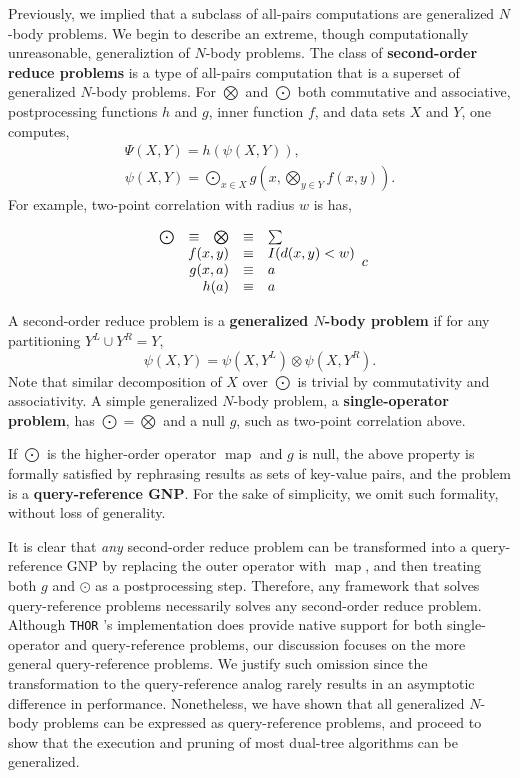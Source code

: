 \documentclass[twoside,leqno,twocolumn]{article}
\newcommand{\THOR}{{{\tt THOR}} }
\newcommand{\union}{\cup}
\DeclareMathOperator*{\map}{map}
\newcommand{\Gnp}{\Psi}
\newcommand{\gnp}{\psi}
\newcommand{\defterm}[1]{{\bf #1}}
\newcommand{\kdleft}[1]{#1^{\!L}}
\newcommand{\kdright}[1]{#1^{\!R}}
\begin{document}
Previously, we implied that a subclass of all-pairs computations are generalized $N$-body problems.
We begin to describe an extreme, though computationally unreasonable, generaliztion of $N$-body problems.
The class of \defterm{second-order reduce problems} is a type of all-pairs computation that is a superset of generalized $N$-body problems.
For $\bigotimes$ and $\bigodot$ both commutative and associative, postprocessing functions $h$ and $g$, inner function $f$, and data sets $X$ and $Y$, one computes,
\[\begin{array}{l}
  \displaystyle \Gnp(X, Y) = h(\gnp(X, Y)),
  \\
  \displaystyle \gnp(X, Y) = \bigodot_{x \in X} g\!\left(x, \bigotimes_{y \in Y} f(x, y) \right).
\end{array}\]
\noindent
For example, two-point correlation with radius $w$ is has,

\[\begin{array}{ccccl}
  \bigodot &\equiv& \bigotimes &\equiv& \sum
  \\
  \multicolumn{3}{r}{f(x,y)} &\equiv& I(d(x,y) < w)
  \\
  \multicolumn{3}{r}{g(x, a)} &\equiv& a
  \\
  \multicolumn{3}{r}{h(a)} &\equiv& a
\end{array}{c}\]

A second-order reduce problem is a \defterm{generalized $N$-body problem} if for any partitioning $\kdleft{Y} \union \kdright{Y} = Y$,
\[\gnp(X,Y) = \gnp(X,\kdleft{Y}) \otimes \gnp(X,\kdright{Y}).\]
\noindent Note that similar decomposition of $X$ over $\bigodot$ is trivial by commutativity and associativity.
A simple generalized $N$-body problem, a \defterm{single-operator problem}, has $\bigodot = \bigotimes$ and a null $g$, such as two-point correlation above.

If $\bigodot$ is the higher-order operator $\map$ and $g$ is null, the above property is formally satisfied by rephrasing results as sets of key-value pairs, and the problem is a \defterm{query-reference GNP}.
For the sake of simplicity, we omit such formality, without loss of generality.

It is clear that {\em any} second-order reduce problem can be transformed into a query-reference GNP by replacing the outer operator with $\map$, and then treating both $g$ and $\odot$ as a postprocessing step.
Therefore, any framework that solves query-reference problems necessarily solves any second-order reduce problem.
Although \THOR's implementation does provide native support for both single-operator and query-reference problems, our discussion focuses on the more general query-reference problems.
We justify such omission since the transformation to the query-reference analog rarely results in an asymptotic difference in performance.
Nonetheless, we have shown that all generalized $N$-body problems can be expressed as query-reference problems, and proceed to show that the execution and pruning of most dual-tree algorithms can be generalized.
\end{document}
